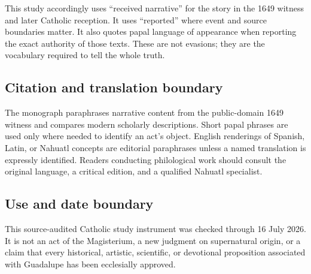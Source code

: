 {

This study accordingly uses “received narrative” for the story in the 1649 witness and later Catholic reception. It uses “reported” where event and source boundaries matter. It also quotes papal language of appearance when reporting the exact authority of those texts. These are not evasions; they are the vocabulary required to tell the whole truth.

\subsection{Citation and translation boundary}

The monograph paraphrases narrative content from the public-domain 1649 witness and compares modern scholarly descriptions. Short papal phrases are used only where needed to identify an act's object. English renderings of Spanish, Latin, or Nahuatl concepts are editorial paraphrases unless a named translation is expressly identified. Readers conducting philological work should consult the original language, a critical edition, and a qualified Nahuatl specialist.

\subsection{Use and date boundary}

This source-audited Catholic study instrument was checked through 16 July 2026. It is not an act of the Magisterium, a new judgment on supernatural origin, or a claim that every historical, artistic, scientific, or devotional proposition associated with Guadalupe has been ecclesially approved.
}
